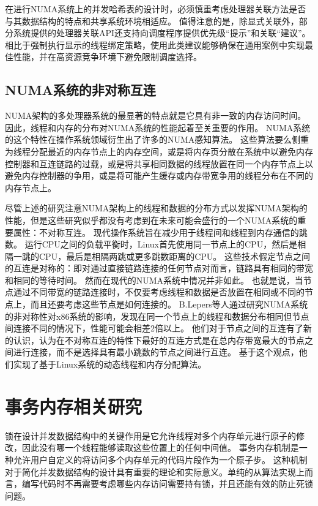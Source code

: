 在进行NUMA系统上的并发哈希表的设计时，必须慎重考虑处理器关联方法是否与其数据结构的特点和共享系统环境相适应。 
值得注意的是，除显式关联外，部分系统提供的处理器关联API还支持向调度程序提供优先级“提示”和关联“建议”。 相比于强制执行显示的线程绑定策略，使用此类建议能够确保在通用案例中实现最佳性能，并在高资源竞争环境下避免限制调度选择\cite{majo2017library}。

\subsection{NUMA系统的非对称互连}
\label{sec:}
NUMA架构的多处理器系统的最显著的特点就是它具有非一致的内存访问时间。
因此，线程和内存的分布对NUMA系统的性能起着至关重要的作用。
NUMA系统的这个特性在操作系统领域衍生出了许多的NUMA感知算法。
这些算法要么侧重为线程分配最近的内存节点上的内存空间\cite{brecht1993importance,lachaize2012memprof,dashti2013traffic}，或是将内存页分散在系统中以避免内存控制器和互连链路的过载\cite{dashti2013traffic}，或是将共享相同数据的线程放置在同一个内存节点上\cite{tam2007thread,tang2013optimizing}以避免内存控制器的争用\cite{bull2002data,blagodurov2010case,tang2013optimizing}，或是将可能产生缓存或内存带宽争用的线程分布在不同的内存节点上。

尽管上述的研究注意NUMA架构上的线程和数据的分布方式以发挥NUMA架构的性能，但是这些研究似乎都没有考虑到在未来可能会盛行的一个NUMA系统的重要属性：不对称互连。
现代操作系统旨在减少用于线程间和线程到内存通信的跳数。
运行CPU之间的负载平衡时，Linux首先使用同一节点上的CPU，然后是相隔一跳的CPU，最后是相隔两跳或更多跳数距离的CPU。
这些技术假定节点之间的互连是对称的：即对通过直接链路连接的任何节点对而言，链路具有相同的带宽和相同的等待时间。
然而在现代的NUMA系统中情况并非如此。
也就是说，当节点通过不同带宽的链路连接时，不仅要考虑线程和数据是否放置在相同或不同的节点上，而且还要考虑这些节点是如何连接的。
B.Lepers\cite{lepers2015thread}等人通过研究NUMA系统的非对称性对x86系统的影响，发现在同一个节点上的线程和数据分布相同但节点间连接不同的情况下，性能可能会相差2倍以上。
他们对于节点之间的互连有了新的认识，认为在不对称互连的特性下最好的互连方式是在总内存带宽最大的节点之间进行连接，而不是选择具有最小跳数的节点之间进行互连。
基于这个观点，他们实现了基于Linux系统的动态线程和内存分配算法\cite{lepers2015thread}。


\section{事务内存相关研究}
锁在设计并发数据结构中的关键作用是它允许线程对多个内存单元进行原子的修改，因此没有哪一个线程能够读取这些位置上的任何中间值。
事务内存机制是一种允许用户自定义的将访问多个内存单元的代码片段作为一个原子步\cite{moir2004concurrent}。
这种机制对于简化并发数据结构的设计具有重要的理论和实际意义。单纯的从算法实现上而言，编写代码时不再需要考虑哪些内存访问需要持有锁，并且还能有效的防止死锁问题。

